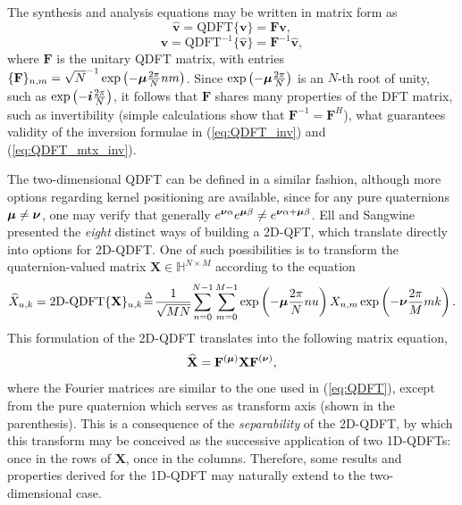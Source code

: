 The synthesis and analysis equations may be written in matrix form as
\begin{equation}
\label{eq:QDFT}
\widehat{\mathbf{v}} = \text{QDFT}\{ \mathbf{v} \} = \mathbf{F} \mathbf{v},
\end{equation}
\begin{equation}
\label{eq:QDFT_mtx_inv}
\mathbf{v} = \text{QDFT}^{-1}\{ \widehat{\mathbf{v}} \} = \mathbf{F}^{-1} \widehat{\mathbf{v}},
\end{equation}
where $ \mathbf{F} $ is the unitary QDFT matrix, with entries $ \{\mathbf{F}\}_{n,m} = \sqrt{N}^{-1} \exp \left( -\boldsymbol{\mu} \frac{2\pi}{N} nm \right)$. Since $ \exp \left( -\boldsymbol{\mu} \frac{2\pi}{N} \right) $ is an $ N $-th root of unity, such as $ \exp \left( -\boldsymbol{i} \frac{2\pi}{N} \right) $, it follows that $ \mathbf{F} $ shares many properties of the DFT matrix, such as invertibility (simple calculations show that $ \mathbf{F}^{-1} = \mathbf{F}^{H} $), what guarantees validity of the inversion formulae in (\ref{eq:QDFT_inv}) and (\ref{eq:QDFT_mtx_inv}).

The two-dimensional QDFT can be defined in a similar fashion, although more options regarding kernel positioning are available, since for any pure quaternions $ \boldsymbol{\mu} \neq \boldsymbol{\nu} $, one may verify that generally $ e^{\boldsymbol{\nu} \alpha} e^{\boldsymbol{\mu} \beta} \neq e^{\boldsymbol{\nu} \alpha + \boldsymbol{\mu} \beta} $. Ell and Sangwine \cite{ell2014quaternion} presented the \textit{eight} distinct ways of building a 2D-QFT, which translate directly into options for 2D-QDFT. One of such possibilities is to transform the quaternion-valued matrix $ \mathbf{X} \in \mathbb{H}^{N\times M}$ according to the equation
\begin{equation}
\label{eq:2DQDFT-01}
\widehat{X}_{u,k} = 
\text{2D-QDFT}\{ \mathbf{X} \}_{u,k} \!\overset{\Delta}{=}\! \frac{1}{\sqrt{MN}} \!\sum_{n=0}^{N-1} \sum_{m=0}^{M-1}  \exp \left( -\boldsymbol{\mu} \frac{2\pi}{N} nu \right) X_{n,m} \exp \left( -\boldsymbol{\nu} \frac{2\pi}{M} mk \right).
\end{equation}
This formulation of the 2D-QDFT translates into the following matrix equation,
\begin{equation}
\label{eq:2DQDFT-02}
\widehat{\mathbf{X}} = \mathbf{F}^{(\boldsymbol{\mu})} \mathbf{X} \mathbf{F}^{(\boldsymbol{\nu})},
\end{equation}
where the Fourier matrices are similar to the one used in (\ref{eq:QDFT}), except from the pure quaternion which serves as transform axis (shown in the parenthesis). This is a consequence of the \textit{separability} of the 2D-QDFT, by which this transform may be conceived as the successive application of two 1D-QDFTs: once in the rows of $ \mathbf{X} $, once in the columns. Therefore, some results and properties derived for the 1D-QDFT may naturally extend to the two-dimensional case.

